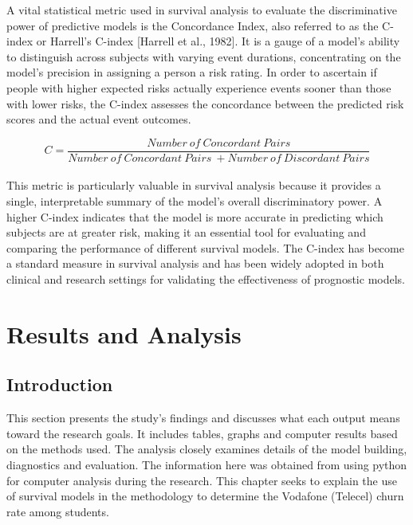 \documentclass[doublespacing,12pt]{report}
\begin{document}
A vital statistical metric used in survival analysis to evaluate the discriminative power of predictive models is the Concordance Index, also referred to as the C-index or Harrell's C-index [Harrell et al., 1982]. It is a gauge of a model's ability to distinguish across subjects with varying event durations, concentrating on the model's precision in assigning a person a risk rating.
In order to ascertain if people with higher expected risks actually experience events sooner than those with lower risks, the C-index assesses the concordance between the predicted risk scores and the actual event outcomes.

\begin{equation}
C=\frac{Number\ of\ Concordant\ Pairs}{Number\ of\ Concordant\ Pairs\ +Number\ of\ Discordant\ Pairs}
\end{equation}\\
This metric is particularly valuable in survival analysis because it provides a single, interpretable summary of the model's overall discriminatory power. A higher C-index indicates that the model is more accurate in predicting which subjects are at greater risk, making it an essential tool for evaluating and comparing the performance of different survival models. The C-index has become a standard measure in survival analysis and has been widely adopted in both clinical and research settings for validating the effectiveness of prognostic models.



\newpage
\chapter{Results and Analysis}
\section{Introduction}
This section presents the study's findings and discusses what each output means toward the research goals. It includes tables, graphs and computer results based on the methods used. The analysis closely examines details of the model building, diagnostics and evaluation. The information here was obtained from using python for computer analysis during the research. This chapter seeks to explain the use of survival models in the methodology to determine the Vodafone (Telecel) churn rate among students.
\end{document}
